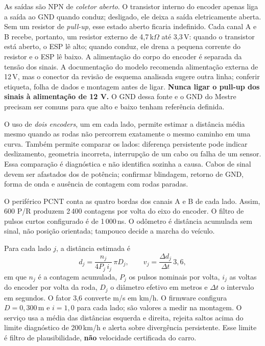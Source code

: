 As saídas são NPN de \emph{coletor aberto}. O transistor interno do encoder apenas liga a saída ao GND quando conduz; desligado, ele deixa a saída eletricamente aberta. Sem um resistor de \emph{pull-up}, esse estado aberto ficaria indefinido. Cada canal A e B recebe, portanto, um resistor externo de 4,7\,k$\Omega$ até 3,3\,V: quando o transistor está aberto, o ESP lê alto; quando conduz, ele drena a pequena corrente do resistor e o ESP lê baixo. A alimentação do corpo do encoder é separada da tensão dos sinais. A documentação do modelo recomenda alimentação externa de 12\,V, mas o conector da revisão de esquema analisada sugere outra linha; conferir etiqueta, folha de dados e montagem antes de ligar. \textbf{Nunca ligar o pull-up dos sinais à alimentação de 12 V.} O GND dessa fonte e o GND do Mestre precisam ser comuns para que alto e baixo tenham referência definida.

O uso de \emph{dois encoders}, um em cada lado, permite estimar a distância média mesmo quando as rodas não percorrem exatamente o mesmo caminho em uma curva. Também permite comparar os lados: diferença persistente pode indicar deslizamento, geometria incorreta, interrupção de um cabo ou falha de um sensor. Essa comparação é diagnóstica e não identifica sozinha a causa. Cabos de sinal devem ser afastados dos de potência; confirmar blindagem, retorno de GND, forma de onda e ausência de contagem com rodas paradas.

O periférico PCNT conta as quatro bordas dos canais A e B de cada lado. Assim, 600 P/R produzem 2\,400 contagens por volta do eixo do encoder. O filtro de pulsos curtos configurado é de 1\,000\,ns. O odômetro é distância acumulada sem sinal, não posição orientada; tampouco decide a marcha do veículo.

Para cada lado $j$, a distância estimada é
\begin{equation}
d_j=\frac{n_j}{4P_j\,i_j}\,\pi D_j ,
\qquad
v_j=\frac{\Delta d_j}{\Delta t}\,3{,}6 ,
\label{eq:encoder}
\end{equation}
em que $n_j$ é a contagem acumulada, $P_j$ os pulsos nominais por volta, $i_j$ as voltas do encoder por volta da roda, $D_j$ o diâmetro efetivo em metros e $\Delta t$ o intervalo em segundos. O fator 3,6 converte m/s em km/h. O firmware configura $D=0{,}300$\,m e $i=1{,}0$ para cada lado; são valores a medir na montagem. O serviço usa a média das distâncias esquerda e direita, rejeita saltos acima do limite diagnóstico de 200\,km/h e alerta sobre divergência persistente. Esse limite é filtro de plausibilidade, \textbf{não} velocidade certificada do carro.

